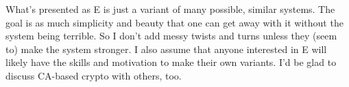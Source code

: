 \documentclass{article}
\begin{document}
\begin{huge}
{{What's presented as E is just a variant of many possible, similar systems. The goal is as much simplicity and beauty that one can get away with it without the system being terrible. So I don't add messy twists and turns unless they (seem to) make the system stronger. I also assume that anyone interested in E will likely have the skills and motivation to make their own variants. I'd be glad to discuss CA-based crypto with others, too.   

}}
\end{huge}
\end{document}
